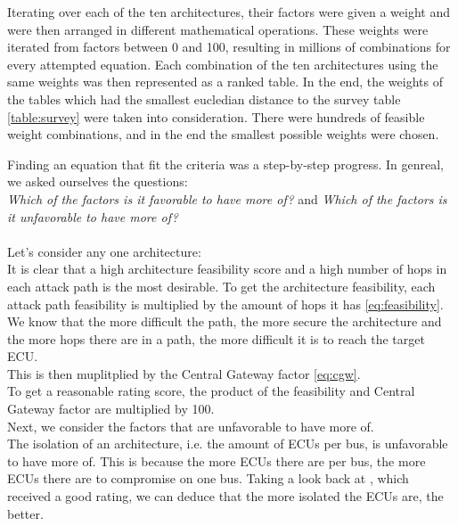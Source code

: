 \hfill  \break

Iterating over each of the ten architectures, their factors were given a weight and were then arranged in different mathematical operations.
These weights were iterated from factors between 0 and 100, resulting in millions of combinations for every attempted equation.
Each combination of the ten architectures using the same weights was then represented as a ranked table. 
In the end, the weights of the tables which had the smallest eucledian distance to the survey table \ref{table:survey} were taken into consideration.
There were hundreds of feasible weight combinations, and in the end the smallest possible weights were chosen.

Finding an equation that fit the criteria was a step-by-step progress.
In genreal, we asked ourselves the questions:\\
\textit{Which of the factors is it favorable to have more of?} and \textit{Which of the factors is it unfavorable to have more of?}\\\\

Let's consider any one architecture:\\
It is clear that a high architecture feasibility score and a high number of hops in each attack path is the most desirable.
To get the architecture feasibility, each attack path feasibility is multiplied by the amount of hops it has \ref{eq:feasibility}.
We know that the more difficult the path, the more secure the architecture and the more hops there are in a path, the more difficult it is to reach the target ECU.\\

This is then muplitplied by the Central Gateway factor \ref{eq:cgw}.\\

To get a reasonable rating score, the product of the feasibility and Central Gateway factor are multiplied by 100.\\


Next, we consider the factors that are unfavorable to have more of.\\

The isolation of an architecture, i.e. the amount of ECUs per bus, is unfavorable to have more of.
This is because the more ECUs there are per bus, the more ECUs there are to compromise on one bus.
Taking a look back at , which received a good rating, we can deduce that the more isolated the ECUs are, the better.\\

